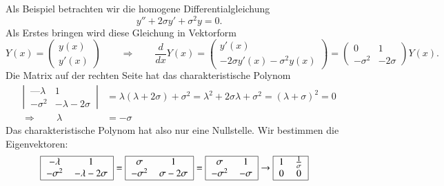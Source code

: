 \begin{beispiel}
Als Beispiel betrachten wir die homogene Differentialgleichung
\[
y''+2\sigma y'+\sigma^2y=0.
\]
Als Erstes bringen wird diese Gleichung in Vektorform 
\[
Y(x)=\begin{pmatrix}
y(x)\\y'(x)
\end{pmatrix}
\qquad\Rightarrow\qquad
\frac{d}{dx}Y(x)
=
\begin{pmatrix}
y'(x)\\
-2\sigma y'(x)-\sigma^2y(x)
\end{pmatrix}
=
\begin{pmatrix}
0&1\\
-\sigma^2& -2\sigma
\end{pmatrix}
Y(x).
\]
Die Matrix auf der rechten Seite hat das charakteristische Polynom
%
\begin{align*}
\left|\,\begin{matrix}
—\lambda&1\\
-\sigma^2&-\lambda-2\sigma
\end{matrix}\,\right|
&=
\lambda(\lambda+2\sigma)+\sigma^2
=
\lambda^2+2\sigma\lambda+\sigma^2=(\lambda+\sigma)^2=0
\\
\Rightarrow\qquad
\lambda&=-\sigma
\end{align*}
Das charakteristische Polynom hat also nur eine Nullstelle.
Wir bestimmen die Eigenvektoren:
%
\begin{align*}
\begin{tabular}{|>{$}c<{$}>{$}c<{$}|}
\hline
-\lambda & 1\\
-\sigma^2&-\lambda-2\sigma\\
\hline
\end{tabular}
&=
\begin{tabular}{|>{$}c<{$}>{$}c<{$}|}
\hline
\sigma & 1\\
-\sigma^2&\sigma-2\sigma\\
\hline
\end{tabular}
=
\begin{tabular}{|>{$}c<{$}>{$}c<{$}|}
\hline
\sigma & 1\\
-\sigma^2&-\sigma\\
\hline
\end{tabular}
\rightarrow
\begin{tabular}{|>{$}c<{$}>{$}c<{$}|}
\hline
1&\frac1{\sigma}\\
0&0\\
\hline
\end{tabular}

\end{align*}
\end{beispiel}
